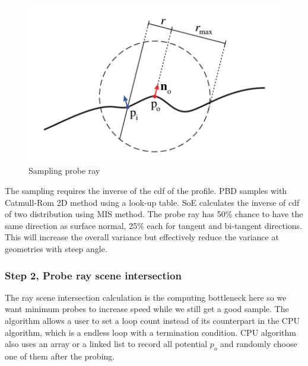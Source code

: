 \documentclass[letterpaper,12pt]{article}
\begin{document}
\begin{figure}[H] 
        \centering \includegraphics[width=0.8\columnwidth]{probeRay.png}
        \caption{\label{fig:probe}Sampling probe ray}
\end{figure}

The sampling requires the inverse of the cdf of the profile. PBD samples with Catmull-Rom 2D method using a look-up table. SoE calculates the inverse of cdf of two distribution using MIS method. The probe ray has 50\% chance to have the same direction as surface normal, 25\% each for tangent and bi-tangent directions. This will increase the overall variance but effectively reduce the variance at geometries with steep angle.

\subsubsection{Step 2, Probe ray scene intersection}

The ray scene intersection calculation is the computing bottleneck here so we want minimum probes to increase speed while we still get a good sample. The algorithm allows a user to set a loop count instead of its counterpart in the CPU algorithm, which is a endless loop with a termination condition. CPU algorithm also uses an array or a linked list to record all potential $p_o$ and randomly choose one of them after the probing.
\end{document}
